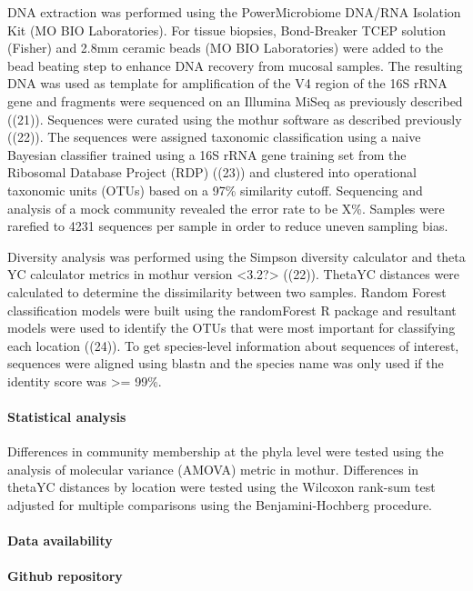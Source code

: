 \documentclass[11pt,]{article}
\let\oldparagraph\paragraph
\renewcommand{\paragraph}[1]{\oldparagraph{#1}\mbox{}}
\begin{document}
DNA extraction was performed using the PowerMicrobiome DNA/RNA Isolation
Kit (MO BIO Laboratories). For tissue biopsies, Bond-Breaker TCEP
solution (Fisher) and 2.8mm ceramic beads (MO BIO Laboratories) were
added to the bead beating step to enhance DNA recovery from mucosal
samples. The resulting DNA was used as template for amplification of the
V4 region of the 16S rRNA gene and fragments were sequenced on an
Illumina MiSeq as previously described ((21)). Sequences were curated
using the mothur software as described previously ((22)). The sequences
were assigned taxonomic classification using a naive Bayesian classifier
trained using a 16S rRNA gene training set from the Ribosomal Database
Project (RDP) ((23)) and clustered into operational taxonomic units
(OTUs) based on a 97\% similarity cutoff. Sequencing and analysis of a
mock community revealed the error rate to be X\%. Samples were rarefied
to 4231 sequences per sample in order to reduce uneven sampling bias.

Diversity analysis was performed using the Simpson diversity calculator
and theta YC calculator metrics in mothur version
\textless{}3.2?\textgreater{} ((22)). ThetaYC distances were calculated
to determine the dissimilarity between two samples. Random Forest
classification models were built using the randomForest R package and
resultant models were used to identify the OTUs that were most important
for classifying each location ((24)). To get species-level information
about sequences of interest, sequences were aligned using blastn and the
species name was only used if the identity score was \textgreater{}=
99\%.

\paragraph{Statistical analysis}\label{statistical-analysis}

Differences in community membership at the phyla level were tested using
the analysis of molecular variance (AMOVA) metric in mothur. Differences
in thetaYC distances by location were tested using the Wilcoxon rank-sum
test adjusted for multiple comparisons using the Benjamini-Hochberg
procedure.

\paragraph{Data availability}\label{data-availability}

\paragraph{Github repository}\label{github-repository}
\end{document}
